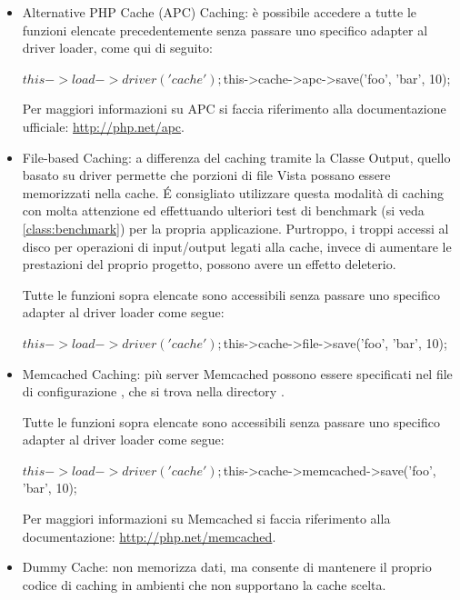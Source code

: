 \begin{itemize}
\item Alternative PHP Cache (APC) Caching: è possibile accedere a tutte le funzioni elencate precedentemente senza passare uno specifico adapter al driver loader, come qui di seguito:

\begin{code}
$this->load->driver('cache');
$this->cache->apc->save('foo', 'bar', 10);
\end{code}

Per maggiori informazioni su \ac{APC} si faccia riferimento alla documentazione ufficiale: \url{http://php.net/apc}.

\item File-based Caching: a differenza del caching tramite la Classe Output, quello basato su driver permette che porzioni di file Vista possano essere memorizzati nella cache. \'E consigliato utilizzare questa modalità di caching con molta attenzione ed effettuando ulteriori test di benchmark (si veda \vref{class:benchmark}) per la propria applicazione. Purtroppo, i troppi accessi al disco per operazioni di input/output legati alla cache, invece di aumentare le prestazioni del proprio progetto, possono avere un effetto deleterio.

Tutte le funzioni sopra elencate sono accessibili senza passare uno specifico adapter al driver loader come segue:

\begin{code}
$this->load->driver('cache');
$this->cache->file->save('foo', 'bar', 10);
\end{code}

\item Memcached Caching: più server Memcached possono essere specificati nel file di configurazione , che si trova nella directory .

Tutte le funzioni sopra elencate sono accessibili senza passare uno specifico adapter al driver loader come segue:

\begin{code}
$this->load->driver('cache');
$this->cache->memcached->save('foo', 'bar', 10);
\end{code}

Per maggiori informazioni su Memcached si faccia riferimento alla documentazione: \url{http://php.net/memcached}.

\item Dummy Cache: non memorizza dati, ma consente di mantenere il proprio codice di caching in ambienti che non supportano la cache scelta.
\end{itemize}
